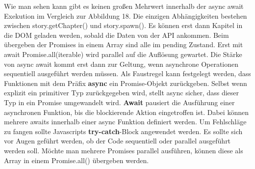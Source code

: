 \noindent
Wie man sehen kann gibt es keinen großen Mehrwert innerhalb der async await Exekution im Vergleich zur Abbildung 18. Die einzigen Abhängigkeiten bestehen zwischen story.getChapter() und story.spawn(). Es können erst dann Kapitel in die DOM geladen werden, sobald die Daten von der API ankommen. Beim übergeben der Promises in einem Array sind alle im pending Zustand. Erst mit await Promise.all(iterable) wird parallel auf die Auflösung gewartet. Die Stärke von async await kommt erst dann zur Geltung, wenn asynchrone Operationen sequentiell ausgeführt werden müssen. Als Faustregel kann festgelegt werden, dass Funktionen mit dem Präfix \textbf{async} ein Promise-Objekt zurückgeben. Selbst wenn explizit ein primitiver Typ zurückgegeben wird, stellt async sicher, dass dieser Typ in ein Promise umgewandelt wird. \textbf{Await} pausiert die Ausführung einer asynchronen Funktion, bis die blockierende Aktion eingetroffen ist. Dabei können mehrere awaits innerhalb einer async Funktion definiert werden. Um Fehlschläge zu fangen sollte Javascripts \textbf{try-catch}-Block angewendet werden. Es sollte sich vor Augen geführt werden, ob der Code sequentiell oder parallel ausgeführt werden soll. Möchte man mehrere Promises parallel ausführen, können diese als Array in einem Promise.all() übergeben werden.


